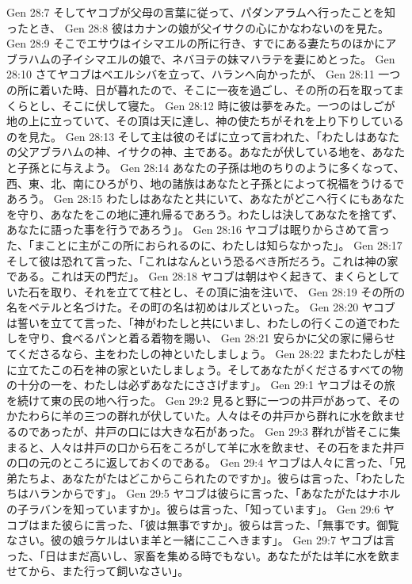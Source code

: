Gen 28:7  そしてヤコブが父母の言葉に従って、パダンアラムへ行ったことを知ったとき、
Gen 28:8  彼はカナンの娘が父イサクの心にかなわないのを見た。
Gen 28:9  そこでエサウはイシマエルの所に行き、すでにある妻たちのほかにアブラハムの子イシマエルの娘で、ネバヨテの妹マハラテを妻にめとった。
Gen 28:10  さてヤコブはベエルシバを立って、ハランへ向かったが、
Gen 28:11  一つの所に着いた時、日が暮れたので、そこに一夜を過ごし、その所の石を取ってまくらとし、そこに伏して寝た。
Gen 28:12  時に彼は夢をみた。一つのはしごが地の上に立っていて、その頂は天に達し、神の使たちがそれを上り下りしているのを見た。
Gen 28:13  そして主は彼のそばに立って言われた、「わたしはあなたの父アブラハムの神、イサクの神、主である。あなたが伏している地を、あなたと子孫とに与えよう。
Gen 28:14  あなたの子孫は地のちりのように多くなって、西、東、北、南にひろがり、地の諸族はあなたと子孫とによって祝福をうけるであろう。
Gen 28:15  わたしはあなたと共にいて、あなたがどこへ行くにもあなたを守り、あなたをこの地に連れ帰るであろう。わたしは決してあなたを捨てず、あなたに語った事を行うであろう」。
Gen 28:16  ヤコブは眠りからさめて言った、「まことに主がこの所におられるのに、わたしは知らなかった」。
Gen 28:17  そして彼は恐れて言った、「これはなんという恐るべき所だろう。これは神の家である。これは天の門だ」。
Gen 28:18  ヤコブは朝はやく起きて、まくらとしていた石を取り、それを立てて柱とし、その頂に油を注いで、
Gen 28:19  その所の名をベテルと名づけた。その町の名は初めはルズといった。
Gen 28:20  ヤコブは誓いを立てて言った、「神がわたしと共にいまし、わたしの行くこの道でわたしを守り、食べるパンと着る着物を賜い、
Gen 28:21  安らかに父の家に帰らせてくださるなら、主をわたしの神といたしましょう。
Gen 28:22  またわたしが柱に立てたこの石を神の家といたしましょう。そしてあなたがくださるすべての物の十分の一を、わたしは必ずあなたにささげます」。
Gen 29:1  ヤコブはその旅を続けて東の民の地へ行った。
Gen 29:2  見ると野に一つの井戸があって、そのかたわらに羊の三つの群れが伏していた。人々はその井戸から群れに水を飲ませるのであったが、井戸の口には大きな石があった。
Gen 29:3  群れが皆そこに集まると、人々は井戸の口から石をころがして羊に水を飲ませ、その石をまた井戸の口の元のところに返しておくのである。
Gen 29:4  ヤコブは人々に言った、「兄弟たちよ、あなたがたはどこからこられたのですか」。彼らは言った、「わたしたちはハランからです」。
Gen 29:5  ヤコブは彼らに言った、「あなたがたはナホルの子ラバンを知っていますか」。彼らは言った、「知っています」。
Gen 29:6  ヤコブはまた彼らに言った、「彼は無事ですか」。彼らは言った、「無事です。御覧なさい。彼の娘ラケルはいま羊と一緒にここへきます」。
Gen 29:7  ヤコブは言った、「日はまだ高いし、家畜を集める時でもない。あなたがたは羊に水を飲ませてから、また行って飼いなさい」。
